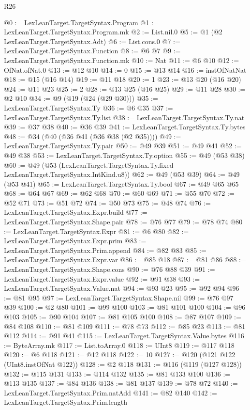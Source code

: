 \begin{lexlean}{R26}
\begin{coremodule}
@0 := LexLeanTarget.TargetSyntax.Program
@1 := LexLeanTarget.TargetSyntax.Program.mk
@2 := List.nil.{0}
@5 := @1 (@2 LexLeanTarget.TargetSyntax.Adt)
@6 := List.cons.{0}
@7 := LexLeanTarget.TargetSyntax.Function
@8 := @6 @7
@9 := LexLeanTarget.TargetSyntax.Function.mk
@10 := Nat
@11 := @6 @10
@12 := OfNat.ofNat.{0}
@13 := @12 @10
@14 := 0
@15 := @13 @14
@16 := instOfNatNat
@18 := @15 (@16 @14)
@19 := @11 @18
@20 := 1
@23 := @13 @20 (@16 @20)
@24 := @11 @23
@25 := 2
@28 := @13 @25 (@16 @25)
@29 := @11 @28
@30 := @2 @10
@34 := @9 (@19 (@24 (@29 @30)))
@35 := LexLeanTarget.TargetSyntax.Ty
@36 := @6 @35
@37 := LexLeanTarget.TargetSyntax.Ty.list
@38 := LexLeanTarget.TargetSyntax.Ty.nat
@39 := @37 @38
@40 := @36 @39
@41 := LexLeanTarget.TargetSyntax.Ty.bytes
@48 := @34 (@40 (@36 @41 (@36 @38 (@2 @35))))
@49 := LexLeanTarget.TargetSyntax.Ty.pair
@50 := @49 @39
@51 := @49 @41
@52 := @49 @38
@53 := LexLeanTarget.TargetSyntax.Ty.option
@55 := @49 (@53 @38)
@60 := @49 (@53 (LexLeanTarget.TargetSyntax.Ty.fixed LexLeanTarget.TargetSyntax.IntKind.u8))
@62 := @49 (@53 @39)
@64 := @49 (@53 @41)
@65 := LexLeanTarget.TargetSyntax.Ty.bool
@67 := @49 @65 @65
@68 := @64 @67
@69 := @62 @68
@70 := @60 @69
@71 := @55 @70
@72 := @52 @71
@73 := @51 @72
@74 := @50 @73
@75 := @48 @74
@76 := LexLeanTarget.TargetSyntax.Expr.build
@77 := LexLeanTarget.TargetSyntax.Shape.pair
@78 := @76 @77
@79 := @78 @74
@80 := LexLeanTarget.TargetSyntax.Expr
@81 := @6 @80
@82 := LexLeanTarget.TargetSyntax.Expr.prim
@83 := LexLeanTarget.TargetSyntax.Prim.append
@84 := @82 @83
@85 := LexLeanTarget.TargetSyntax.Expr.var
@86 := @85 @18
@87 := @81 @86
@88 := LexLeanTarget.TargetSyntax.Shape.cons
@90 := @76 @88 @39
@91 := LexLeanTarget.TargetSyntax.Expr.value
@92 := @91 @38
@93 := LexLeanTarget.TargetSyntax.Value.nat
@94 := @93 @23
@95 := @92 @94
@96 := @81 @95
@97 := LexLeanTarget.TargetSyntax.Shape.nil
@99 := @76 @97 @39
@100 := @2 @80
@101 := @99 @100
@103 := @81 @101 @100
@104 := @96 @103
@105 := @90 @104
@107 := @81 @105 @100
@108 := @87 @107
@109 := @84 @108
@110 := @81 @109
@111 := @78 @73
@112 := @85 @23
@113 := @81 @112
@114 := @91 @41
@115 := LexLeanTarget.TargetSyntax.Value.bytes
@116 := ByteArray.mk
@117 := List.toArray.{0}
@118 := UInt8
@119 := @117 @118
@120 := @6 @118
@121 := @12 @118
@122 := 10
@127 := @120 (@121 @122 (UInt8.instOfNat @122))
@128 := @2 @118
@131 := @116 (@119 (@127 @128))
@132 := @115 @131
@133 := @114 @132
@135 := @81 @133 @100
@136 := @113 @135
@137 := @84 @136
@138 := @81 @137
@139 := @78 @72
@140 := LexLeanTarget.TargetSyntax.Prim.natAdd
@141 := @82 @140
@142 := LexLeanTarget.TargetSyntax.Prim.length

\end{coremodule}
\end{lexlean}
